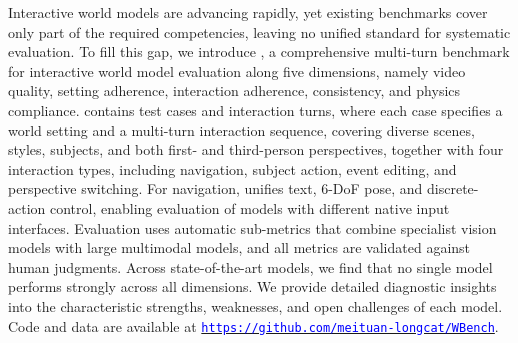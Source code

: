 Interactive world models are advancing rapidly, yet existing benchmarks cover only part of the required competencies, leaving no unified standard for systematic evaluation.
To fill this gap, we introduce \textbf{\benchmark}, a comprehensive multi-turn benchmark for interactive world model evaluation along five dimensions, namely video quality, setting adherence, interaction adherence, consistency, and physics compliance.
\benchmark contains \numvideo test cases and \numturn interaction turns, where each case specifies a world setting and a multi-turn interaction sequence, covering diverse scenes, styles, subjects, and both first- and third-person perspectives, together with four interaction types, including navigation, subject action, event editing, and perspective switching.
For navigation, \benchmark unifies text, 6-DoF pose, and discrete-action control, enabling evaluation of models with different native input interfaces.
Evaluation uses \numsubmetric automatic sub-metrics that combine specialist vision models with large multimodal models, and all metrics are validated against human judgments.
Across \nummodel state-of-the-art models, we find that no single model performs strongly across all dimensions. We provide detailed diagnostic insights into the characteristic strengths, weaknesses, and open challenges of each model.
Code and data are available at \href{https://github.com/meituan-longcat/WBench}{\texttt{\textcolor{blue}{https://github.com/meituan-longcat/WBench}}}.
